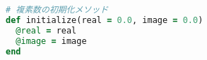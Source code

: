 \begin{lstlisting}[language=Ruby,caption=複素数の初期化メソッド,label=pro:initMethod]
# 複素数の初期化メソッド
def initialize(real = 0.0, image = 0.0)
  @real = real
  @image = image
end
\end{lstlisting}
